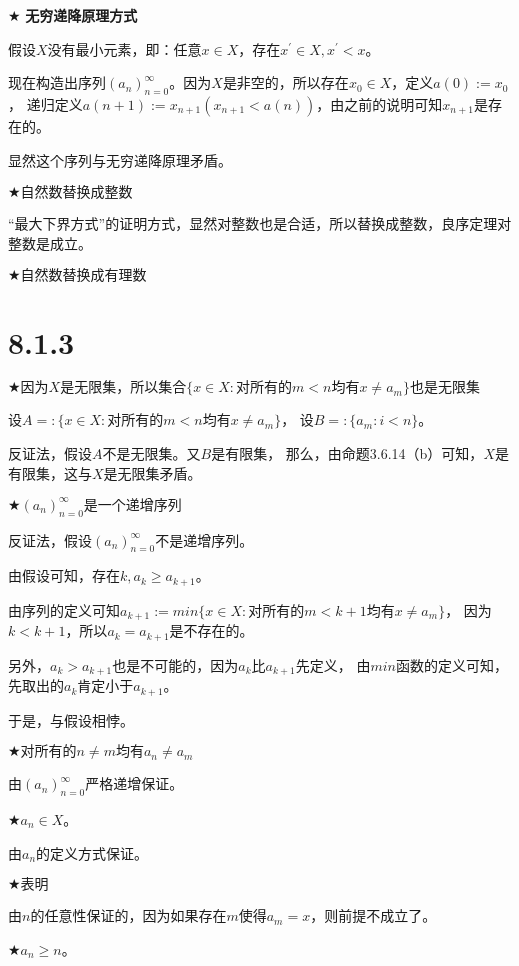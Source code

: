 \documentclass{article}
\theoremstyle{mystyle}
\begin{document}
$\bigstar$ \textbf{无穷递降原理方式}

假设$X$没有最小元素，即：任意$x \in X$，存在$x^\prime \in X, x^\prime < x$。

现在构造出序列$(a_n)_{n=0}^\infty$。因为$X$是非空的，所以存在$x_0 \in X$，定义$a(0) := x_0$，
递归定义$a(n+1) := x_{n+1} (x_{n+1} < a(n))$，由之前的说明可知$x_{n+1}$是存在的。

显然这个序列与无穷递降原理矛盾。

$\bigstar \textbf{自然数替换成整数}$

“最大下界方式”的证明方式，显然对整数也是合适，所以替换成整数，良序定理对整数是成立。

$\bigstar \textbf{自然数替换成有理数}$

\section*{8.1.3}

$\bigstar \textbf{因为$X$是无限集，所以集合$\{x \in X: \text{对所有的$m < n$均有$x \neq a_m$}\}$也是无限集}$

设$A =: \{x \in X: \text{对所有的$m < n$均有$x \neq a_m$}\}$，
设$B =: \{a_m: i < n\}$。

反证法，假设$A$不是无限集。又$B$是有限集，
那么，由命题3.6.14（b）可知，$X$是有限集，这与$X$是无限集矛盾。

$\bigstar (a_n)_{n=0}^\infty \textbf{是一个递增序列} $

反证法，假设$(a_n)_{n=0}^\infty$不是递增序列。

由假设可知，存在$k, a_k \geq a_{k+1}$。

由序列的定义可知$a_{k+1} := min\{x \in X: \text{对所有的$m < k+1$均有$x \neq a_m$}\}$，
因为$k < k+1$，所以$a_k = a_{k+1}$是不存在的。

另外，$a_k > a_{k+1}$也是不可能的，因为$a_k$比$a_{k+1}$先定义，
由$min$函数的定义可知，先取出的$a_k$肯定小于$a_{k+1}$。

于是，与假设相悖。

$\bigstar \textbf{对所有的}n \neq m \textbf{均有} a_n \neq a_m$

由$(a_n)_{n=0}^\infty$严格递增保证。

$\bigstar a_n \in X$。

由$a_n$的定义方式保证。

$\bigstar \textbf{表明}$

由$n$的任意性保证的，因为如果存在$m$使得$a_m = x$，则前提不成立了。


$\bigstar a_n \geq n$。
\end{document}
